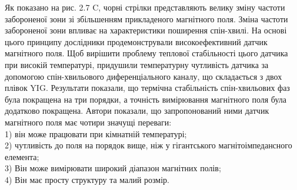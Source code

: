 \documentclass[a4paper,14pt]{extreport}
\begin{document}
\begin{figure}[h]
   \caption{}
 \end{figure}



Як показано на рис. 2.7 C, чорні стрілки представляють велику зміну частоти забороненої зони зі збільшенням прикладеного магнітного поля. Зміна частоти забороненої зони впливає на характеристики поширення спін-хвилі. На основі цього принципу дослідники продемонстрували високоефективний датчик магнітного поля. Щоб вирішити проблему теплової стабільності цього датчика при високій температурі,  придушили температурну чутливість датчика за допомогою спін-хвильового диференціального каналу, що складається з двох плівок YIG. Результати показали, що термічна стабільність спін-хвильових фаз була покращена на три порядки, а точність вимірювання магнітного поля була додатково покращена. Автори показали, що запропонований ними датчик магнітного поля має чотири значущі переваги: \\ 

1) він може працювати при кімнатній температурі; \\ 

2) чутливість до поля на порядок вище, ніж у гігантського магнітоімпедансного елемента;\\ 

3) Він може вимірювати широкий діапазон магнітних полів; \\ 

4) Він має просту структуру та малий розмір. \\ 
\end{document}
